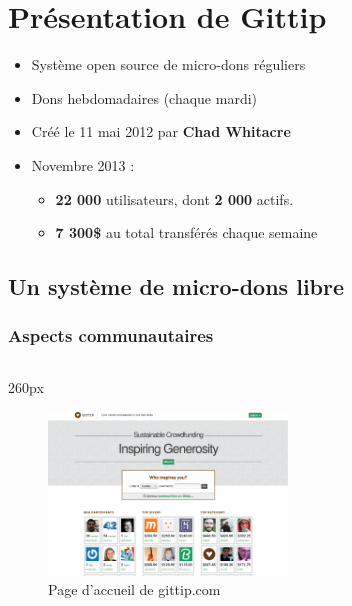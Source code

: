     \section{Présentation de Gittip}


\begin{frame}
\begin{itemize}
    \itemsep1.5em
    \item Système open source de micro-dons réguliers
    \item Dons hebdomadaires (chaque mardi)
    \item Créé le 11 mai 2012 par \textbf{Chad Whitacre}
    \item Novembre 2013 :
        \begin{itemize}
            \item \textbf{22 000} utilisateurs, dont \textbf{2 000} actifs.
            \item \textbf{7 300\${}} au total transférés chaque semaine
        \end{itemize}
\end{itemize}
\end{frame}


    \subsection{Un système de micro-dons libre}


{
\logo{}
\begin{frame}
\frametitle{Aspects communautaires}
\begin{center}
\begin{columns}
\begin{column}{260px}
{
    \begin{figure}[h!]
        \centering
        \includegraphics[width=240px]{images/section1/homepage-gittip.eps}
        \caption{Page d'accueil de gittip.com}
    \end{figure}
}
\end{column}
\end{columns}
\end{center}
\end{frame}
}


